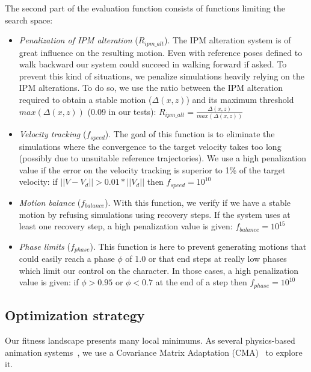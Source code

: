\documentclass[runningheads,a4paper,10pt]{llncs}
\begin{document}
The second part of the evaluation function consists of functions limiting the search space:
\begin{itemize}
\item{\textit{Penalization of IPM alteration} ($R_{ipm\_alt}$). The IPM alteration system is of great influence on the resulting motion. Even with reference poses defined to walk backward our system could succeed in walking forward if asked. To prevent this kind of situations, we penalize simulations heavily relying on the IPM alterations. To do so, we use the ratio between the IPM alteration required to obtain a stable motion ($\Delta(x,z)$) and its maximum threshold $max(\Delta(x,z))$ (0.09 in our tests): $R_{ipm\_alt}=\frac{\Delta(x,z)}{max(\Delta(x,z))}$}
\item{\textit{Velocity tracking} ($f_{speed}$). The goal of this function is to eliminate the simulations where the convergence to the target velocity takes too long (possibly due to unsuitable reference trajectories). We use a high penalization value if the error on the velocity tracking is superior to 1\% of the target velocity: if $||V-V_d||>0.01*||V_d||$ then $f_{speed}=10^{10}$}
\item{\textit{Motion balance} ($f_{balance}$). With this function, we verify if we have a stable motion by refusing simulations using recovery steps. If the system uses at least one recovery step, a high penalization value is given: $f_{balance}=10^{15}$}
\item{\textit{Phase limits} ($f_{phase}$). This function is here to prevent generating motions that could easily reach a phase $\phi$ of 1.0 or that end steps at really low phases which limit our control on the character. In those cases, a high penalization value is given: if $\phi>0.95$ or $\phi<0.7$ at the end of a step then $f_{phase}=10^{10}$}
\end{itemize}

\subsection{Optimization strategy}
Our fitness landscape presents many local minimums. As several physics-based animation systems~\citep{geijtenbeek2012simple,tan2011articulated}, we use a Covariance Matrix Adaptation (CMA)~\citep{hansen2006cma} to explore it.
\end{document}

